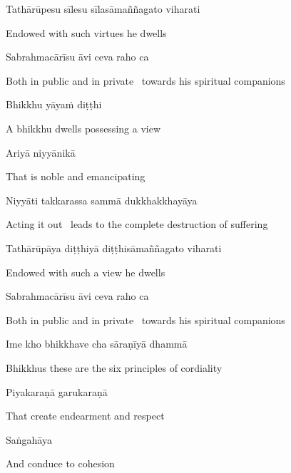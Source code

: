 Tathārūpesu sīlesu sīlasāmaññagato viharati

\begin{cprenglish}
  Endowed with such virtues he dwells
\end{cprenglish}

Sabrahmacārīsu āvi ceva raho ca

\begin{cprenglish}
  Both in public and in private \breathmark\ towards his spiritual companions
\end{cprenglish}

Bhikkhu yāyaṁ diṭṭhi

\begin{cprenglish}
  A bhikkhu dwells possessing a view
\end{cprenglish}

Ariyā niyyānikā

\begin{cprenglish}
  That is noble and emancipating
\end{cprenglish}

Niyyāti takkarassa sammā dukkhakkhayāya

\begin{cprenglish}
  Acting it out \breathmark\ leads to the complete destruction of suffering
\end{cprenglish}

Tathārūpāya diṭṭhiyā diṭṭhisāmaññagato viharati

\begin{cprenglish}
  Endowed with such a view he dwells
\end{cprenglish}

Sabrahmacārīsu āvi ceva raho ca

\begin{cprenglish}
  Both in public and in private \breathmark\ towards his spiritual companions
\end{cprenglish}

Ime kho bhikkhave cha sāraṇīyā dhammā

\begin{cprenglish}
  Bhikkhus these are the six principles of cordiality
\end{cprenglish}

Piyakaraṇā garukaraṇā

\begin{cprenglish}
  That create endearment and respect
\end{cprenglish}

Saṅgahāya

\begin{cprenglish}
  And conduce to cohesion
\end{cprenglish}

